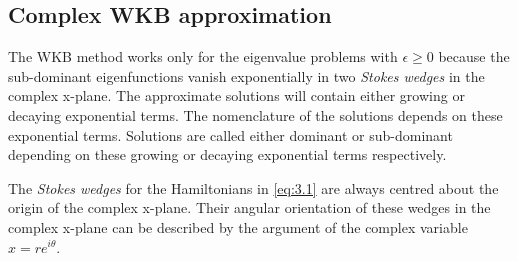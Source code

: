 \documentclass[12pt, a4paper]{report}
\begin{document}
\subsection{Complex WKB approximation}\label{WKB}
The WKB method works only for the eigenvalue problems with $\epsilon \geq 0$ because the sub-dominant eigenfunctions vanish exponentially in two \emph{Stokes wedges} in the complex x-plane\cite{PTsymmetricQM}. The approximate solutions will contain either growing or decaying exponential terms. The nomenclature of the solutions depends on these exponential terms. Solutions are called either dominant or sub-dominant depending on these growing or decaying exponential terms respectively. 

The \emph{Stokes wedges} for the Hamiltonians in \ref{eq:3.1} are always centred about the origin of the complex x-plane. Their angular orientation of these wedges in the complex x-plane can be described by the argument of the complex variable $x = re^{i\theta}$\cite{Scatteringoff}.
\end{document}
